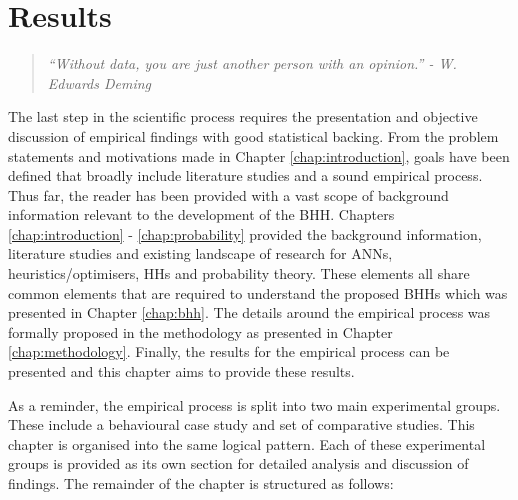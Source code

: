 \chapter{Results}
\label{chap:results}


\begin{quote}
    \textit{
    ``Without data, you are just another person with an opinion.'' - W. Edwards Deming
    }
\end{quote}

The last step in the scientific process requires the presentation and objective discussion of empirical findings with good statistical backing. From the problem statements and motivations made in Chapter \ref{chap:introduction}, goals have been defined that broadly include literature studies and a sound empirical process. Thus far, the reader has been provided with a vast scope of background information relevant to the development of the \Acs{BHH}. Chapters \ref{chap:introduction} - \ref{chap:probability} provided the background information, literature studies and existing landscape of research for \acp{ANN}, heuristics/optimisers, \acp{HH} and probability theory. These elements all share common elements that are required to understand the proposed \Acp{BHH} which was presented in Chapter \ref{chap:bhh}. The details around the empirical process was formally proposed in the methodology as presented in Chapter \ref{chap:methodology}. Finally, the results for the empirical process can be presented and this chapter aims to provide these results.

As a reminder, the empirical process is split into two main experimental groups. These include a behavioural case study and set of comparative studies. This chapter is organised into the same logical pattern. Each of these experimental groups is provided as its own section for detailed analysis and discussion of findings. The remainder of the chapter is structured as follows: 

